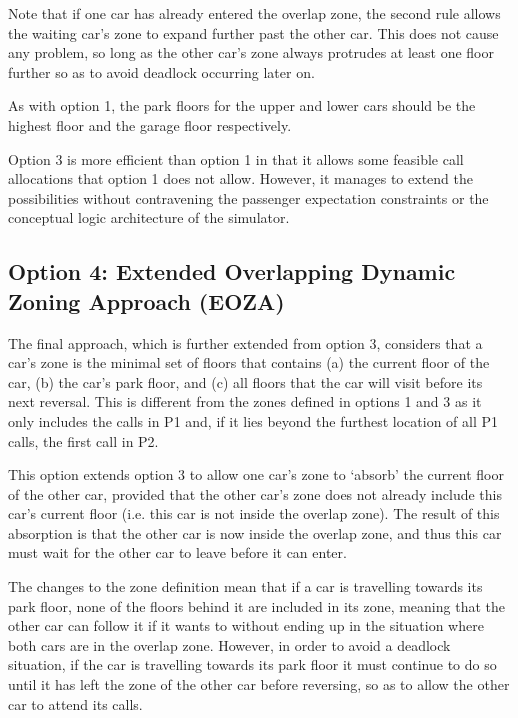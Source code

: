 \documentclass{UoYCSproject}
\begin{document}
Note that if one car has already entered the overlap zone, the second rule allows the waiting car's zone to expand further past the other car.  This does not cause any problem, so long as the other car's zone always protrudes at least one floor further so as to avoid deadlock occurring later on.

As with option 1, the park floors for the upper and lower cars should be the highest floor and the garage floor respectively.

Option 3 is more efficient than option 1 in that it allows some feasible call allocations that option 1 does not allow.  However, it manages to extend the possibilities without contravening the passenger expectation constraints or the conceptual logic architecture of the simulator.

\subsection{Option 4: Extended Overlapping Dynamic Zoning Approach (EOZA)}
\label{tesoption4}

The final approach, which is further extended from option 3, considers that a car's zone is the minimal set of floors that contains (a) the current floor of the car, (b) the car's park floor, and (c) all floors that the car will visit before its next reversal.  This is different from the zones defined in options 1 and 3 as it only includes the calls in P1 and, if it lies beyond the furthest location of all P1 calls, the first call in P2.

This option extends option 3 to allow one car's zone to `absorb' the current floor of the other car, provided that the other car's zone does not already include this car's current floor (i.e. this car is not inside the overlap zone).  The result of this absorption is that the other car is now inside the overlap zone, and thus this car must wait for the other car to leave before it can enter.

The changes to the zone definition mean that if a car is travelling towards its park floor, none of the floors behind it are included in its zone, meaning that the other car can follow it if it wants to without ending up in the situation where both cars are in the overlap zone.  However, in order to avoid a deadlock situation, if the car is travelling towards its park floor it must continue to do so until it has left the zone of the other car before reversing, so as to allow the other car to attend its calls.
\end{document}
